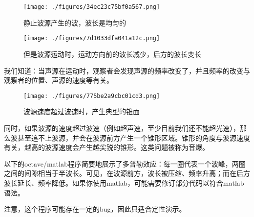 
\begin{figure}[ht]
\centering
\texttt{[image: ./figures/34ec23c75bf0a567.png]}
\caption{静止波源产生的波，波长是均匀的} \label{fig_DPLDRW_1}
\end{figure}

\begin{figure}[ht]
\centering
\texttt{[image: ./figures/7d1033dfa041a12c.png]}
\caption{但是波源运动时，运动方向前的波长减少，后方的波长变长} \label{fig_DPLDRW_2}
\end{figure}

我们知道：当声源在运动时，观察者会发现声源的频率改变了，并且频率的改变与观察者的位置、声源的速度等有关。

\begin{figure}[ht]
\centering
\texttt{[image: ./figures/775be2a9cbc01cd3.png]}
\caption{波源速度超过波速时，产生典型的锥面} \label{fig_DPLDRW_3}
\end{figure}

同时，如果波源的速度超过波速（例如超声速，至少目前我们还不能超光速），那么波甚至追不上波源，并会在波源前方产生一个锥形区域。锥形的角度与波源速度有关，越高的波源速度会产生越尖锐的锥形。这类问题被称为音爆。

以下的octave/matlab程序简要地展示了多普勒效应：每一圈代表一个波峰，两圈之间的间隙相当于半波长。可见，在波源前方，波长被压缩、频率升高；而在后方波长延长、频率降低。如果你使用matlab，可能需要修订部分代码以符合matlab语法。

注意，这个程序可能存在一定的bug，因此只适合定性演示。

